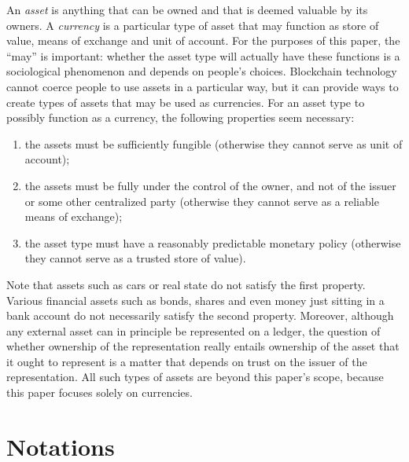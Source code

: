 \documentclass{llncs}
\begin{document}
An \emph{asset} is anything that can be owned and that is deemed valuable by its owners. A \emph{currency} is a particular type of asset that may function as store of value, means of exchange and unit of account. For the purposes of this paper, the ``may'' is important: whether the asset type will actually have these functions is a sociological phenomenon and depends on people's choices. Blockchain technology cannot coerce people to use assets in a particular way, but it can provide ways to create types of assets that may be used as currencies. For an asset type to possibly function as a currency, the following properties seem necessary:
\begin{enumerate}
\item the assets must be sufficiently fungible (otherwise they cannot serve as unit of account);
\item the assets must be fully under the control of the owner, and not of the issuer or some other centralized party (otherwise they cannot serve as a reliable means of exchange);
\item the asset type must have a reasonably predictable monetary policy (otherwise they cannot serve as a trusted store of value).
\end{enumerate}

Note that assets such as cars or real state do not satisfy the first property. Various financial assets such as bonds, shares and even money just sitting in a bank account do not necessarily satisfy the second property. Moreover, although any external asset can in principle be represented on a ledger, the question of whether ownership of the representation really entails ownership of the asset that it ought to represent is a matter that depends on trust on the issuer of the representation. All such types of assets are beyond this paper's scope, because this paper focuses solely on currencies.


\section{Notations}
\end{document}
